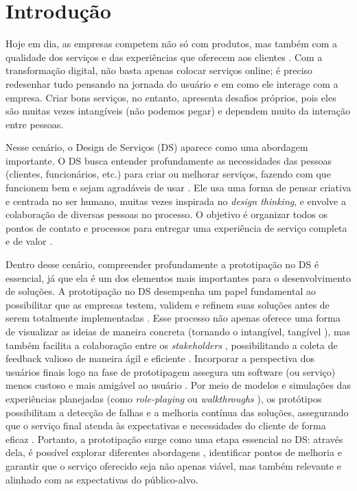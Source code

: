\chapter[Introdução]{Introdução}


Hoje em dia, as empresas competem não só com produtos, mas também com a qualidade dos serviços e das experiências que oferecem aos clientes \cite{PineGilmore1999MuseumNews}. Com a transformação digital, não basta apenas colocar serviços online; é preciso redesenhar tudo pensando na jornada do usuário e em como ele interage com a empresa. Criar bons serviços, no entanto, apresenta desafios próprios, pois eles são muitas vezes intangíveis (não podemos pegar) e dependem muito da interação entre pessoas.

Nesse cenário, o Design de Serviços (DS) aparece como uma abordagem importante. O DS busca entender profundamente as necessidades das pessoas (clientes, funcionários, etc.) para criar ou melhorar serviços, fazendo com que funcionem bem e sejam agradáveis de usar \cite{Stickdorn2019}. Ele usa uma forma de pensar criativa e centrada no ser humano, muitas vezes inspirada no \textit{design thinking}, e envolve a colaboração de diversas pessoas no processo. O objetivo é organizar todos os pontos de contato e processos para entregar uma experiência de serviço completa e de valor \cite{Polaine2013Orange, Mager2009Emerging}.

Dentro desse cenário, compreender profundamente a prototipação no DS é essencial, já que ela é um dos elementos mais importantes para o desenvolvimento de soluções. A prototipação no DS desempenha um papel fundamental ao possibilitar que as empresas testem, validem e refinem suas soluções antes de serem totalmente implementadas \cite{paust2025integrative}. Esse processo não apenas oferece uma forma de visualizar as ideias de maneira concreta (tornando o intangível, tangível \cite{soto2023prototyping, mager2023product}), mas também facilita a colaboração entre os \textit{stakeholders} \cite{paust2025integrative}, possibilitando a coleta de feedback valioso de maneira ágil e eficiente \cite{asbjornsen2022echange}. Incorporar a perspectiva dos usuários finais logo na fase de prototipagem assegura um software (ou serviço) menos custoso e mais amigável ao usuário \cite{Mattjus2023, villa2022integratedcare}. Por meio de modelos e simulações das experiências planejadas (como \textit{role-playing} ou \textit{walkthroughs} \cite{seko2024transitions, soto2023prototyping}), os protótipos possibilitam a detecção de falhas e a melhoria contínua das soluções, assegurando que o serviço final atenda às expectativas e necessidades do cliente de forma eficaz \cite{kumar2023rheumatology}. Portanto, a prototipação surge como uma etapa essencial no DS: através dela, é possível explorar diferentes abordagens \cite{paust2025integrative}, identificar pontos de melhoria e garantir que o serviço oferecido seja não apenas viável, mas também relevante e alinhado com as expectativas do público-alvo.




